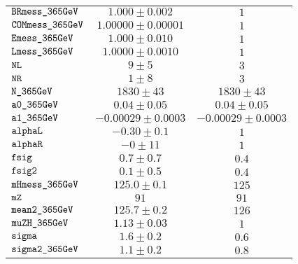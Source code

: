 \begin{tabular}{lcc}
$\verb+BRmess_365GeV+ $ & $  1.000\pm 0.002$ & $ 1$\\
$\verb+COMmess_365GeV+ $ & $  1.00000\pm 0.00001$ & $ 1$\\
$\verb+Emess_365GeV+ $ & $  1.000\pm 0.010$ & $ 1$\\
$\verb+Lmess_365GeV+ $ & $  1.0000\pm 0.0010$ & $ 1$\\
$\verb+NL+ $ & $  9\pm 5$ & $ 3$\\
$\verb+NR+ $ & $  1\pm 8$ & $ 3$\\
$\verb+N_365GeV+ $ & $  1830\pm 43$ & $ 1830\pm 43$\\
$\verb+a0_365GeV+ $ & $  0.04\pm 0.05$ & $ 0.04\pm 0.05$\\
$\verb+a1_365GeV+ $ & $ -0.00029\pm 0.0003$ & $-0.00029\pm 0.0003$\\
$\verb+alphaL+ $ & $ -0.30\pm 0.1$ & $ 1$\\
$\verb+alphaR+ $ & $ -0\pm 11$ & $ 1$\\
$\verb+fsig+ $ & $  0.7\pm 0.7$ & $ 0.4$\\
$\verb+fsig2+ $ & $  0.1\pm 0.5$ & $ 0.4$\\
$\verb+mHmess_365GeV+ $ & $  125.0\pm 0.1$ & $ 125$\\
$\verb+mZ+ $ & $  91$ & $ 91$\\
$\verb+mean2_365GeV+ $ & $  125.7\pm 0.2$ & $ 126$\\
$\verb+muZH_365GeV+ $ & $  1.13\pm 0.03$ & $ 1$\\
$\verb+sigma+ $ & $  1.6\pm 0.2$ & $ 0.6$\\
$\verb+sigma2_365GeV+ $ & $  1.1\pm 0.2$ & $ 0.8$\\
\end{tabular}
